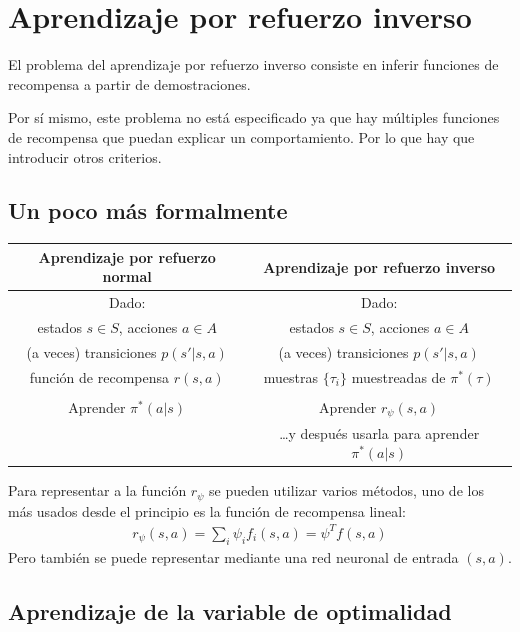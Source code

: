 \section{Aprendizaje por refuerzo inverso}%
\label{sec:aprendizaje_por_refuerzo_inverso}

El problema del aprendizaje por refuerzo inverso consiste en inferir funciones de
recompensa a partir de demostraciones. 

Por sí mismo, este problema no está especificado ya que hay múltiples funciones de
recompensa que puedan explicar un comportamiento. Por lo que hay que introducir otros
criterios.

\subsection{Un poco más formalmente}%
\label{sub:un_poco_más_formalmente}

\begin{center}
    \begin{tabular}{c | c}
        Aprendizaje por refuerzo normal & Aprendizaje por refuerzo inverso\\
        \hline
        Dado: & Dado:\\
        estados $s\in S$, acciones $a\in A$ & estados $s\in S$, acciones $a\in A$\\
        (a veces) transiciones $p(s'|s,a)$ & (a veces) transiciones $p(s'|s,a)$\\
        función de recompensa $r(s,a)$ & muestras $\{\tau_i\}$ muestreadas de $\pi^*(\tau)$
       \\\\
        Aprender $\pi^*(a|s)$ & Aprender $r_\psi(s,a)$\\
                              & \ldots y después usarla para aprender $\pi^*(a|s)$
    \end{tabular}
\end{center}

Para representar a la función $r_\psi$ se pueden utilizar varios métodos, uno de los más
usados desde el principio es la función de recompensa lineal:
\begin{align}
r _ { \psi } ( s , a ) = \sum _ { i } \psi _ { i } f _ { i } ( s , a ) = \psi ^ { T } f ( s , a )
\end{align}
Pero también se puede representar mediante una red neuronal de entrada $(s,a)$.

 \subsection{Aprendizaje de la variable de optimalidad}%
 \label{sub:aprendizaje_de_la_variable_de_optimalidad}
 
